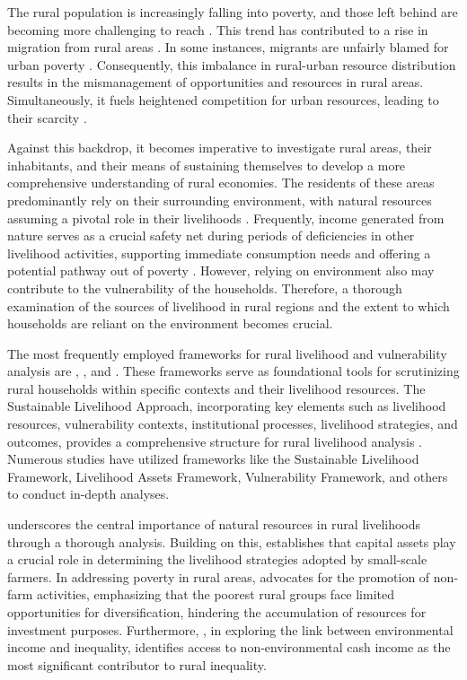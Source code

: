 The rural population is increasingly falling into poverty, and those left behind are becoming more challenging to reach \citep{UN2019}. This trend has contributed to a rise in migration from rural areas \citep{lazarte2017understanding}. In some instances, migrants are unfairly blamed for urban poverty \citep{tacoli2015rural}. Consequently, this imbalance in rural-urban resource distribution results in the mismanagement of opportunities and resources in rural areas. Simultaneously, it fuels heightened competition for urban resources, leading to their scarcity \citep{artuso2011state}. 

Against this backdrop, it becomes imperative to investigate rural areas, their inhabitants, and their means of sustaining themselves to develop a more comprehensive understanding of rural economies. The residents of these areas predominantly rely on their surrounding environment, with natural resources assuming a pivotal role in their livelihoods \citep{nawrotzki2012natural}. Frequently, income generated from nature serves as a crucial safety net during periods of deficiencies in other livelihood activities, supporting immediate consumption needs and offering a potential pathway out of poverty \citep{angelsen2003exploring}. However, relying on environment also may contribute to the vulnerability of the households. Therefore, a thorough examination of the sources of livelihood in rural regions and the extent to which households are reliant on the environment becomes crucial.

The most frequently employed frameworks for rural livelihood and vulnerability analysis are \cite{anani1999sustainable}, \cite{dfid1999sustainable}, and \cite{ellis1999rural}. These frameworks serve as foundational tools for scrutinizing rural households within specific contexts and their livelihood resources. The Sustainable Livelihood Approach, incorporating key elements such as livelihood resources, vulnerability contexts, institutional processes, livelihood strategies, and outcomes, provides a comprehensive structure for rural livelihood analysis \citep{walelign2017dynamics}. Numerous studies have utilized frameworks like the Sustainable Livelihood Framework, Livelihood Assets Framework, Vulnerability Framework, and others to conduct in-depth analyses.

\cite{nawrotzki2012natural} underscores the central importance of natural resources in rural livelihoods through a thorough analysis. Building on this, \cite{diaz2019livelihood} establishes that capital assets play a crucial role in determining the livelihood strategies adopted by small-scale farmers. In addressing poverty in rural areas, \cite{mukotami2014rural} advocates for the promotion of non-farm activities, emphasizing that the poorest rural groups face limited opportunities for diversification, hindering the accumulation of resources for investment purposes. Furthermore, \cite{cavendish2008poverty}, in exploring the link between environmental income and inequality, identifies access to non-environmental cash income as the most significant contributor to rural inequality.

